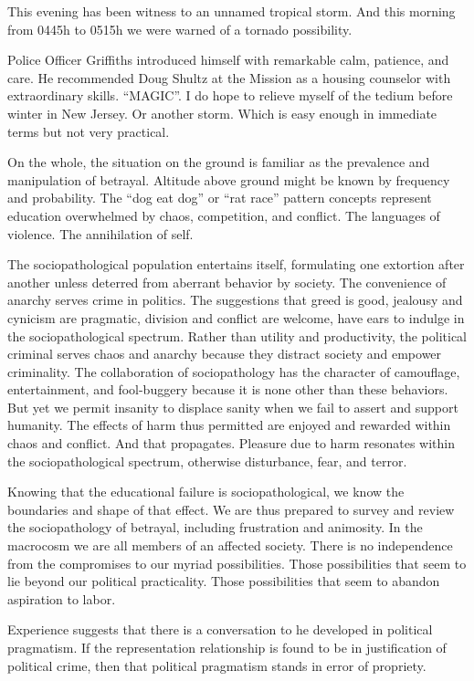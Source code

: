 This evening has been witness to an unnamed tropical storm.  And this
morning from 0445h to 0515h we were warned of a tornado possibility.

Police Officer Griffiths introduced himself with remarkable calm,
patience, and care.  He recommended Doug Shultz at the Mission as a
housing counselor with extraordinary skills.  ``MAGIC''.  I do hope to
relieve myself of the tedium before winter in New Jersey.  Or another
storm.  Which is easy enough in immediate terms but not very
practical.

On the whole, the situation on the ground is familiar as the
prevalence and manipulation of betrayal.  Altitude above ground might
be known by frequency and probability.  The ``dog eat dog'' or ``rat
race'' pattern concepts represent education overwhelmed by chaos,
competition, and conflict.  The languages of violence.  The
annihilation of self.

The sociopathological population entertains itself, formulating one
extortion after another unless deterred from aberrant behavior by
society.  The convenience of anarchy serves crime in politics.  The
suggestions that greed is good, jealousy and cynicism are pragmatic,
division and conflict are welcome, have ears to indulge in the
sociopathological spectrum.  Rather than utility and productivity, the
political criminal serves chaos and anarchy because they distract
society and empower criminality.  The collaboration of sociopathology
has the character of camouflage, entertainment, and fool-buggery
because it is none other than these behaviors.  But yet we permit
insanity to displace sanity when we fail to assert and support
humanity.  The effects of harm thus permitted are enjoyed and rewarded
within chaos and conflict.  And that propagates.  Pleasure due to harm
resonates within the sociopathological spectrum, otherwise
disturbance, fear, and terror.

Knowing that the educational failure is sociopathological, we know the
boundaries and shape of that effect.  We are thus prepared to survey
and review the sociopathology of betrayal, including frustration and
animosity.  In the macrocosm we are all members of an affected
society.  There is no independence from the compromises to our myriad
possibilities.  Those possibilities that seem to lie beyond our
political practicality.  Those possibilities that seem to abandon
aspiration to labor.

Experience suggests that there is a conversation to he developed in
political pragmatism.  If the representation relationship is found to
be in justification of political crime, then that political pragmatism
stands in error of propriety.

